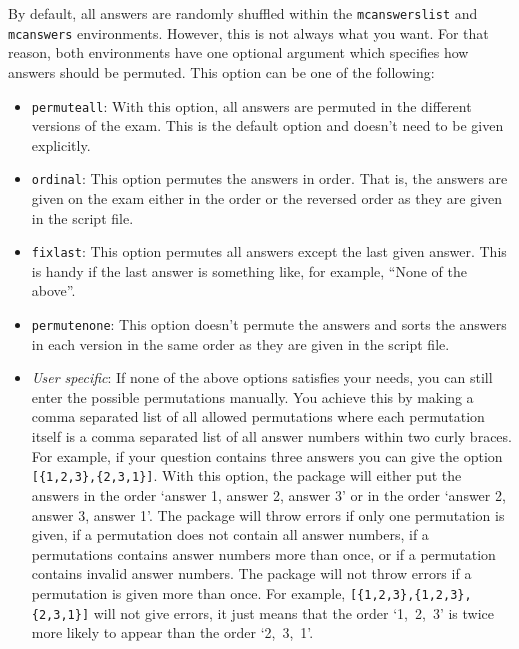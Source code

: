\documentclass{article}
\begin{document}
By default, all answers are randomly shuffled within the \verb$mcanswerslist$ and \verb$mcanswers$ environments. However, this is not always what you want. For that reason, both environments have one optional argument which specifies how answers should be permuted. This option can be one of the following:   
\begin{itemize}
 \item \verb$permuteall$:
       With this option, all answers are permuted in the different versions of the exam. This is the default option and doesn't need to be given explicitly.
 \item \verb$ordinal$:
       This option permutes the answers in order. That is, the answers are given on the exam either in the order or the reversed order as they are given in the script file.
 \item \verb$fixlast$:
       This option permutes all answers except the last given answer. This is handy if the last answer is something like, for example, ``None of the above''. 
 \item \verb$permutenone$:
       This option doesn't permute the answers and sorts the answers in each version in the same order as they are given in the script file.
 \item \emph{User specific}:
       If none of the above options satisfies your needs, you can still enter the possible permutations manually. You achieve this by making a comma separated list of all allowed permutations where each permutation itself is a comma separated list of all answer numbers within two curly braces. For example, if your question contains three answers you can give the option \verb$[{1,2,3},{2,3,1}]$. With this option, the package will either put the answers in the order `answer 1, answer 2, answer 3' or in the order `answer 2, answer 3, answer 1'. The package will throw errors if only one permutation is given, if a permutation does not contain all answer numbers, if a permutations contains answer numbers more than once, or if a permutation contains invalid answer numbers. The package will not throw errors if a permutation is given more than once. For example, \verb$[{1,2,3},{1,2,3},{2,3,1}]$ will not give errors, it just means that the order `1,~2,~3' is twice more likely to appear than the order `2,~3,~1'.
\end{itemize}
\end{document}
